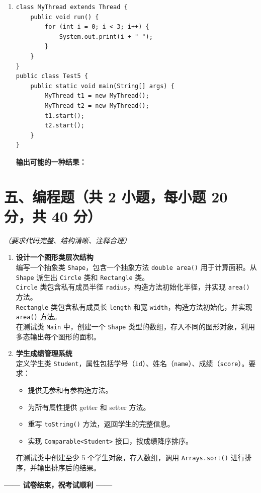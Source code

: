 \documentclass[a3paper, landscape, 11pt, twocolumn]{article}
\begin{document}
\begin{enumerate}[label=\arabic*., itemsep=1em]
	\item
	      \begin{lstlisting}[style=JavaExam]
class MyThread extends Thread {
    public void run() {
        for (int i = 0; i < 3; i++) {
            System.out.print(i + " ");
        }
    }
}
public class Test5 {
    public static void main(String[] args) {
        MyThread t1 = new MyThread();
        MyThread t2 = new MyThread();
        t1.start();
        t2.start();
    }
}
\end{lstlisting}
	      \textbf{输出可能的一种结果：}\underline{\hspace{6cm}}
\end{enumerate}

\newpage

\section*{五、编程题（共 2 小题，每小题 20 分，共 40 分）}
\textit{（要求代码完整、结构清晰、注释合理）}

\begin{enumerate}[label=\arabic*., itemsep=1em]
	\item \textbf{设计一个图形类层次结构} \\
	      编写一个抽象类 \texttt{Shape}，包含一个抽象方法 \texttt{double area()} 用于计算面积。从 \texttt{Shape} 派生出 \texttt{Circle} 类和 \texttt{Rectangle} 类。\\
	      \texttt{Circle} 类包含私有成员半径 \texttt{radius}，构造方法初始化半径，并实现 \texttt{area()} 方法。\\
	      \texttt{Rectangle} 类包含私有成员长 \texttt{length} 和宽 \texttt{width}，构造方法初始化，并实现 \texttt{area()} 方法。\\
	      在测试类 \texttt{Main} 中，创建一个 \texttt{Shape} 类型的数组，存入不同的图形对象，利用多态输出每个图形的面积。
	      \vspace{6cm}

	\item \textbf{学生成绩管理系统} \\
	      定义学生类 \texttt{Student}，属性包括学号（\texttt{id}）、姓名（\texttt{name}）、成绩（\texttt{score}）。要求：
	      \begin{itemize}
		      \item 提供无参和有参构造方法。
		      \item 为所有属性提供 getter 和 setter 方法。
		      \item 重写 \texttt{toString()} 方法，返回学生的完整信息。
		      \item 实现 \texttt{Comparable<Student>} 接口，按成绩降序排序。
	      \end{itemize}
	      在测试类中创建至少 5 个学生对象，存入数组，调用 \texttt{Arrays.sort()} 进行排序，并输出排序后的结果。
	      \vspace{6cm}
\end{enumerate}

\begin{center}
	\textbf{—— 试卷结束，祝考试顺利 ——}
\end{center}
\end{document}
